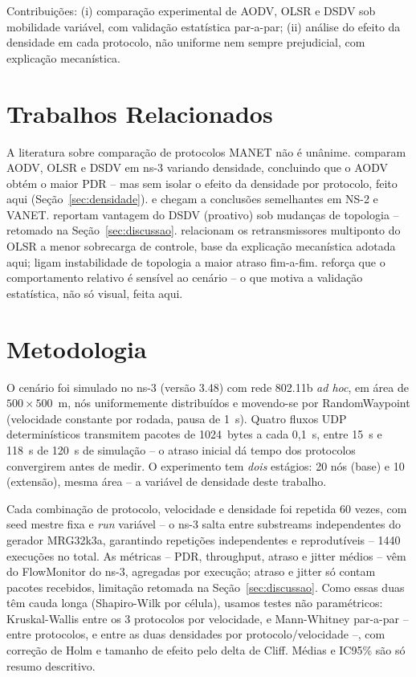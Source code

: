 \documentclass[12pt]{article}
\begin{document}
Contribuições: (i) comparação experimental de AODV, OLSR e DSDV sob mobilidade variável, com validação estatística par-a-par; (ii) análise do efeito da densidade em cada protocolo, não uniforme nem sempre prejudicial, com explicação mecanística.

\section{Trabalhos Relacionados}

A literatura sobre comparação de protocolos MANET não é unânime. \cite{quadri2025} comparam AODV, OLSR e DSDV em ns-3 variando densidade, concluindo que o AODV obtém o maior PDR -- mas sem isolar o efeito da densidade por protocolo, feito aqui (Seção~\ref{sec:densidade}). \cite{arunkumar2008} e \cite{shrivastava2021} chegam a conclusões semelhantes em NS-2 e VANET. \cite{alkhatib2018} reportam vantagem do DSDV (proativo) sob mudanças de topologia -- retomado na Seção~\ref{sec:discussao}. \cite{alzahrani2020} relacionam os retransmissores multiponto do OLSR a menor sobrecarga de controle, base da explicação mecanística adotada aqui; \cite{almaliki2024} ligam instabilidade de topologia a maior atraso fim-a-fim. \cite{chrysoula2012} reforça que o comportamento relativo é sensível ao cenário -- o que motiva a validação estatística, não só visual, feita aqui.

\section{Metodologia}

O cenário foi simulado no ns-3 (versão 3.48) \cite{nsnam2024} com rede 802.11b \textit{ad hoc}, em área de $500\times500$~m, nós uniformemente distribuídos e movendo-se por RandomWaypoint (velocidade constante por rodada, pausa de 1~s). Quatro fluxos UDP determinísticos transmitem pacotes de 1024~bytes a cada 0,1~s, entre 15~s e 118~s de 120~s de simulação -- o atraso inicial dá tempo dos protocolos convergirem antes de medir. O experimento tem \emph{dois} estágios: 20 nós (base) e 10 (extensão), mesma área -- a variável de densidade deste trabalho.

Cada combinação de protocolo, velocidade e densidade foi repetida 60 vezes, com seed mestre fixa e \textit{run} variável -- o ns-3 salta entre substreams independentes do gerador MRG32k3a, garantindo repetições independentes e reprodutíveis -- 1440 execuções no total. As métricas -- PDR, throughput, atraso e jitter médios -- vêm do FlowMonitor do ns-3, agregadas por execução; atraso e jitter só contam pacotes recebidos, limitação retomada na Seção~\ref{sec:discussao}. Como essas duas têm cauda longa (Shapiro-Wilk por célula), usamos testes não paramétricos: Kruskal-Wallis entre os 3 protocolos por velocidade, e Mann-Whitney par-a-par -- entre protocolos, e entre as duas densidades por protocolo/velocidade --, com correção de Holm e tamanho de efeito pelo delta de Cliff. Médias e IC95\% são só resumo descritivo.
\end{document}
